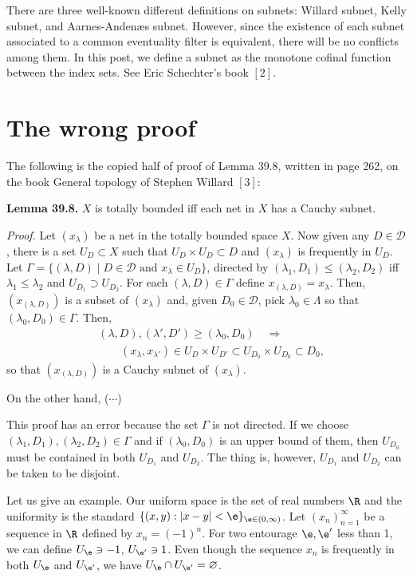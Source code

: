 \documentclass[11pt]{amsart}
\begin{document}
\begin{rmk}
There are three well-known different definitions on subnets: Willard subnet, Kelly subnet, and Aarnes-Andenæs subnet.
However, since the existence of each subnet associated to a common eventuality filter is equivalent, there will be no conflicts among them.
In this post, we define a subnet as the monotone cofinal function between the index sets.
See Eric Schechter's book $[2]$.
\end{rmk}

\section{The wrong proof}
The following is the copied half of proof of Lemma 39.8, written in page 262, on the book General topology of Stephen Willard $[3]$:

\bigskip

\textbf{Lemma 39.8.}
$X$ is totally bounded iff each net in $X$ has a Cauchy subnet.

\textit{Proof.}
Let $(x_\lambda)$ be a net in the totally bounded space $X$.
Now given any $D\in\mathcal{D}$, there is a set $U_D\subset X$ such that $U_D\times U_D\subset D$ and $(x_\lambda)$ is frequently in $U_D$.
Let $\Gamma=\{(\lambda,D)\mid D\in\mathcal{D}\text{ and }x_\lambda\in U_D\}$, directed by $(\lambda_1,D_1)\le(\lambda_2,D_2)$ iff $\lambda_1\le\lambda_2$ and $U_{D_1}\supset U_{D_2}$.
For each $(\lambda,D)\in\Gamma$ define $x_{(\lambda,D)}=x_\lambda$.
Then, $(x_{(\lambda,D)})$ is a subset of $(x_\lambda)$ and, given $D_0\in\mathcal{D}$, pick $\lambda_0\in\Lambda$ so that $(\lambda_0,D_0)\in\Gamma$.
Then,
\begin{align*}
&(\lambda,D),(\lambda',D')\ge(\lambda_0,D_0)\quad\Rightarrow \\
&\qquad(x_\lambda,x_{\lambda'})\in U_D\times U_{D'}\subset U_{D_0}\times U_{D_0}\subset D_0,
\end{align*}
so that $(x_{(\lambda,D)})$ is a Cauchy subnet of $(x_\lambda)$.

On the other hand, ($\cdots$)

\bigskip

This proof has an error because the set $\Gamma$ is not directed.
If we choose $(\lambda_1,D_1),(\lambda_2,D_2)\in\Gamma$ and if $(\lambda_0,D_0)$ is an upper bound of them, then $U_{D_0}$ must be contained in both $U_{D_1}$ and $U_{D_2}$.
The thing is, however, $U_{D_1}$ and $U_{D_2}$ can be taken to be disjoint.

Let us give an example.
Our uniform space is the set of real numbers $\R$ and the uniformity is the standard $\{(x,y):|x-y|<\e\}_{\e\in(0,\infty)}$.
Let $(x_n)_{n=1}^\infty$ be a sequence in $\R$ defined by $x_n=(-1)^n$.
For two entourage $\e,\e'$ less than 1, we can define $U_\e\ni-1$, $U_{\e'}\ni1$.
Even though the sequence $x_n$ is frequently in both $U_\e$ and $U_{\e'}$, we have $U_\e\cap U_{\e'}=\varnothing$.
\end{document}
